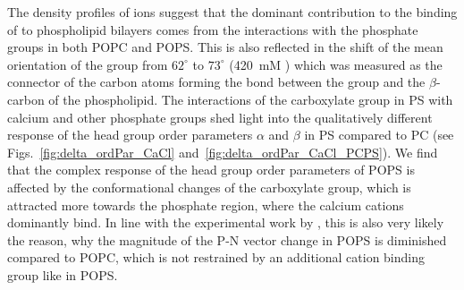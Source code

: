 \documentclass[12pt,a4paper,twoside,openright]{report}
\begin{document}
The density profiles of ions suggest that
the dominant contribution to the binding of  to phospholipid bilayers
comes from the interactions with the phosphate groups in both POPC and POPS. 
This is also reflected in the shift of the mean orientation 
of the  group from $62^\circ$ to $73^\circ$ (420~mM )
which was measured as the connector of the carbon atoms 
forming the bond between the group and the $\beta$-carbon of the phospholipid. 
The interactions of the carboxylate group in PS with calcium and other phosphate groups
shed light into the qualitatively different response of the head group order parameters $\alpha$ and $\beta$ in PS compared to PC 
(see Figs.~\ref{fig:delta_ordPar_CaCl} and~\ref{fig:delta_ordPar_CaCl_PCPS}). 
We find that the complex response of the head group order parameters of POPS 
is affected by the conformational changes of the carboxylate group,
which is attracted more towards the phosphate region, 
where the calcium cations dominantly bind. 
In line with the experimental work by \citet{browning80},
this is also very likely the reason, 
why the magnitude of the P-N vector change in POPS is diminished compared to POPC, 
which is not restrained by an additional cation binding group like  in POPS. 
\end{document}
